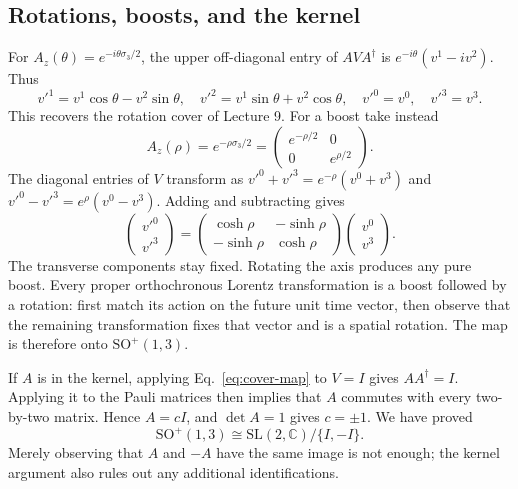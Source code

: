 \documentclass[11pt]{article}
\newcommand{\SO}{\mathrm{SO}}
\newcommand{\C}{\mathbb C}
\newcommand{\SL}{\mathrm{SL}}
\newcommand{\Lor}{\SO^+(1,3)}
\begin{document}
\subsection{Rotations, boosts, and the kernel}
For \(A_z(\theta)=e^{-i\theta\sigma_3/2}\), the upper off-diagonal
entry of \(AVA^\dagger\) is \(e^{-i\theta}(v^1-iv^2)\). Thus
\[
 v'^1=v^1\cos\theta-v^2\sin\theta,\quad
 v'^2=v^1\sin\theta+v^2\cos\theta,\quad v'^0=v^0,\quad v'^3=v^3.
\]
This recovers the rotation cover of Lecture 9. For a boost take instead
\begin{equation}
 A_z(\rho)=e^{-\rho\sigma_3/2}
   =\begin{pmatrix}e^{-\rho/2}&0\\0&e^{\rho/2}\end{pmatrix}.
 \label{eq:spinor-boost}
\end{equation}
The diagonal entries of \(V\) transform as
\(v'^0+v'^3=e^{-\rho}(v^0+v^3)\) and
\(v'^0-v'^3=e^{\rho}(v^0-v^3)\). Adding and subtracting gives
\begin{equation}
 \begin{pmatrix}v'^0\\v'^3\end{pmatrix}
 =\begin{pmatrix}\cosh\rho&-\sinh\rho\\-\sinh\rho&\cosh\rho\end{pmatrix}
 \begin{pmatrix}v^0\\v^3\end{pmatrix}.
 \label{eq:vector-boost}
\end{equation}
The transverse components stay fixed. Rotating the axis produces any
pure boost. Every proper orthochronous Lorentz transformation is a
boost followed by a rotation: first match its action on the future unit
time vector, then observe that the remaining transformation fixes that
vector and is a spatial rotation. The map is therefore onto \(\Lor\).

If \(A\) is in the kernel, applying Eq.~\eqref{eq:cover-map} to \(V=I\)
gives \(AA^\dagger=I\). Applying it to the Pauli matrices then implies
that \(A\) commutes with every two-by-two matrix. Hence \(A=cI\), and
\(\det A=1\) gives \(c=\pm1\). We have proved
\begin{equation}
 \boxed{\Lor\cong\SL(2,\C)/\{I,-I\}.}
 \label{eq:quotient}
\end{equation}
Merely observing that \(A\) and \(-A\) have the same image is not enough;
the kernel argument also rules out any additional identifications.
\end{document}
